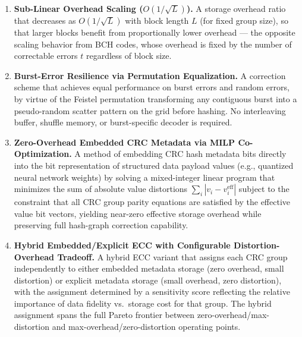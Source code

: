 \begin{enumerate}
    \item \textbf{Sub-Linear Overhead Scaling ($O(1/\sqrt{L})$).}
    A storage overhead ratio that decreases as $O(1/\sqrt{L})$ with block length $L$ (for fixed group size), so that larger blocks benefit from proportionally lower overhead --- the opposite scaling behavior from BCH codes, whose overhead is fixed by the number of correctable errors $t$ regardless of block size.

    \item \textbf{Burst-Error Resilience via Permutation Equalization.}
    A correction scheme that achieves equal performance on burst errors and random errors, by virtue of the Feistel permutation transforming any contiguous burst into a pseudo-random scatter pattern on the grid before hashing.
    No interleaving buffer, shuffle memory, or burst-specific decoder is required.

    \item \textbf{Zero-Overhead Embedded CRC Metadata via MILP Co-Optimization.}
    A method of embedding CRC hash metadata bits directly into the bit representation of structured data payload values (e.g., quantized neural network weights) by solving a mixed-integer linear program that minimizes the sum of absolute value distortions $\sum_i |v_i - v_i^{\text{eff}}|$ subject to the constraint that all CRC group parity equations are satisfied by the effective value bit vectors, yielding near-zero effective storage overhead while preserving full hash-graph correction capability.

    \item \textbf{Hybrid Embedded/Explicit ECC with Configurable Distortion-Overhead Tradeoff.}
    A hybrid ECC variant that assigns each CRC group independently to either embedded metadata storage (zero overhead, small distortion) or explicit metadata storage (small overhead, zero distortion), with the assignment determined by a sensitivity score reflecting the relative importance of data fidelity vs.\ storage cost for that group.
    The hybrid assignment spans the full Pareto frontier between zero-overhead/max-distortion and max-overhead/zero-distortion operating points.

\end{enumerate}
